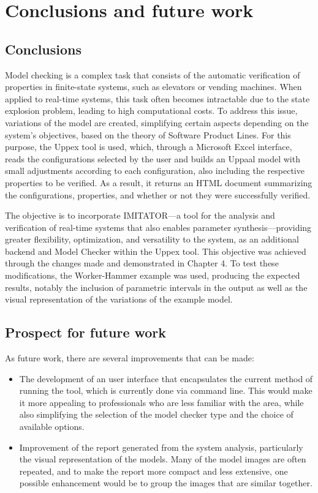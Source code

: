 \chapter{Conclusions and future work}

\section*{Conclusions}

Model checking is a complex task that consists of the automatic verification of properties in finite-state systems, such as elevators or vending machines. When applied to real-time systems, this task often becomes intractable due to the state explosion problem, leading to high computational costs. To address this issue, variations of the model are created, simplifying certain aspects depending on the system’s objectives, based on the theory of Software Product Lines. For this purpose, the Uppex tool is used, which, through a Microsoft Excel interface, reads the configurations selected by the user and builds an Uppaal model with small adjustments according to each configuration, also including the respective properties to be verified. As a result, it returns an HTML document summarizing the configurations, properties, and whether or not they were successfully verified.

The objective is to incorporate IMITATOR—a tool for the analysis and verification of real-time systems that also enables parameter synthesis—providing greater flexibility, optimization, and versatility to the system, as an additional backend and Model Checker within the Uppex tool. This objective was achieved through the changes made and demonstrated in Chapter 4. To test these modifications, the Worker-Hammer example was used, producing the expected results, notably the inclusion of parametric intervals in the output as well as the visual representation of the variations of the example model.

\section*{Prospect for future work}

As future work, there are several improvements that can be made:

\begin{itemize}

    \item The development of an user interface that encapsulates the current method of running the tool, which is currently done via command line. This would make it more appealing to professionals who are less familiar with the area, while also simplifying the selection of the model checker type and the choice of available options.

    \item Improvement of the report generated from the system analysis, particularly the visual representation of the models. Many of the model images are often repeated, and to make the report more compact and less extensive, one possible enhancement would be to group the images that are similar together.

\end{itemize}
		